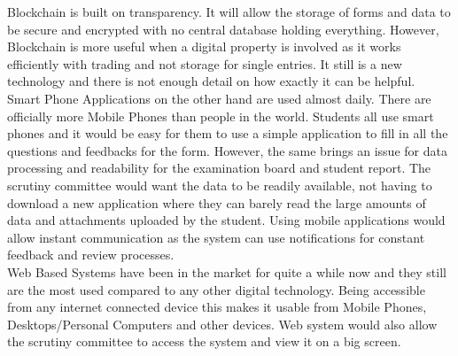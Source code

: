 \documentclass[../main.tex]{subfiles}
\begin{document}
\raggedright

Blockchain is built on transparency. It will allow the storage of forms and data to be secure and encrypted with no central database holding everything. However, Blockchain is more useful when a digital property is involved as it works efficiently with trading and not storage for single entries. It still is a new technology and there is not enough detail on how exactly it can be helpful\cite{vergeblockchain}.\\[2mm]

Smart Phone Applications on the other hand are used almost daily. There are officially more Mobile Phones than people in the world\cite{morephones}. Students all use smart phones and it would be easy for them to use a simple application to fill in all the questions and feedbacks for the form. However, the same brings an issue for data processing and readability for the examination board and student report. The scrutiny committee would want the data to be readily available, not having to download a new application where they can barely read the large amounts of data and attachments uploaded by the student. Using mobile applications would allow instant communication as the system can use notifications for constant feedback and review processes. \\[2mm]

Web Based Systems have been in the market for quite a while now and they still are the most used compared to any other digital technology\cite{morewebsites}.
Being accessible from any internet connected device this makes it usable from Mobile Phones, Desktops/Personal Computers and other devices. Web system would also allow the scrutiny committee to access the system and view it on a big screen. 
\end{document}
